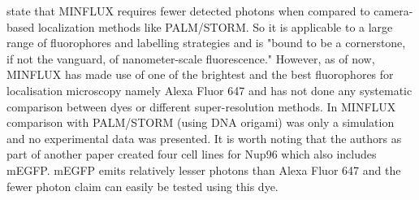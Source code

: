 \documentclass[9pt,twocolumn,twoside]{pnas-new}
\begin{document}
 \cite{gwosch2020minflux} state that MINFLUX requires fewer detected photons when compared to camera-based localization methods like PALM/STORM. So it is applicable to a large range of fluorophores and labelling strategies and is  "bound to be a cornerstone, if not the vanguard, of nanometer-scale fluorescence." However, as of now, MINFLUX has made use of one of the brightest and the best fluorophores for localisation microscopy namely Alexa Fluor 647 and has not done any systematic comparison between dyes or different super-resolution methods. In \cite{balzarotti2017nanometer} MINFLUX comparison with PALM/STORM (using DNA origami) was only a simulation and no experimental data was presented. It is worth noting that the authors as part of another paper \citep{thevathasan2019nuclear} created four cell lines for Nup96 which also includes mEGFP. mEGFP emits relatively lesser photons than Alexa Fluor 647 and the fewer photon claim can easily be tested using this dye. 
\end{document}

